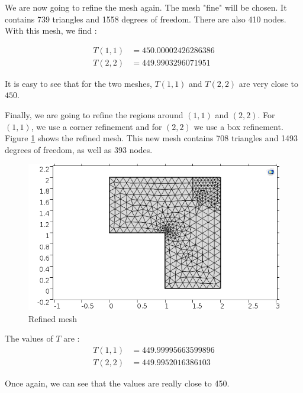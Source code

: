 We are now going to refine the mesh again. The mesh "fine" will be chosen. It contains 739 triangles and 1558 degrees of freedom. There are also 410 nodes. With this mesh, we find : 

\begin{align*}
T(1,1)&=450.00002426286386   \\
T(2,2)&=449.9903296071951
\end{align*}

It is easy to see that for the two meshes, $T(1,1)$ and $T(2,2)$ are very close to $450$.

Finally, we are going to refine the regions around $(1,1)$ and $(2,2)$. For $(1,1)$, we use a corner refinement and for $(2,2)$ we use a box refinement. Figure \ref{refine} shows the refined mesh. This new mesh contains 708 triangles and 1493 degrees of freedom, as well as 393 nodes.

\begin{figure}
\begin{center}
\includegraphics[scale=0.6]{refine.png}
\caption{Refined mesh}
\label{refine}
\end{center}
\end{figure}

The values of $T$ are :
\begin{align*}
T(1,1)&=449.99995663599896   \\
T(2,2)&=449.9952016386103
\end{align*}

Once again, we can see that the values are really close to 450.